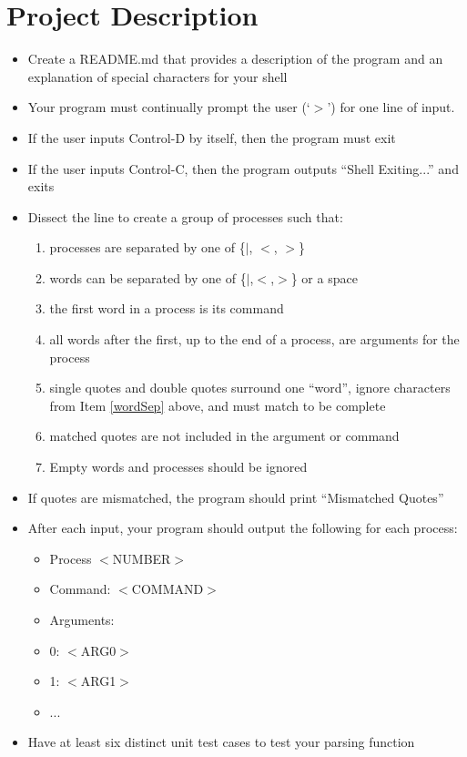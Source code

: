 \documentclass[12pt]{article}
\begin{document}
\section*{Project Description}
\begin{itemize}
\item Create a README.md that provides a description of the program and an explanation of special characters for your shell
\item Your program must continually prompt the user (`$>$') for one line of input.
\item If the user inputs Control-D by itself, then the program must exit
\item If the user inputs Control-C, then the program outputs ``Shell Exiting...'' and exits
\item Dissect the line to create a group of processes such that:
	\begin{enumerate}
	\item processes are separated by one of \{$|$, $<$, $>$\}
	\item \label{wordSep} words can be separated by one of \{$|$,$<$,$>$\} or a space
	\item the first word in a process is its command
	\item all words after the first, up to the end of a process, are arguments for the process
	\item single quotes and double quotes surround one ``word'', ignore characters from Item \ref*{wordSep} above, and must match to be complete
	\item matched quotes are not included in the argument or command
	\item Empty words and processes should be ignored
	\end{enumerate}
\item If quotes are mismatched, the program should print ``Mismatched Quotes''
\item After each input, your program should output the following for each process:
	\begin{itemize}
	\item Process $<$NUMBER$>$
	\item Command: $<$COMMAND$>$
	\item Arguments:
	\item 0: $<$ARG0$>$
	\item 1: $<$ARG1$>$
	\item ...
	\end{itemize}
\item Have at least six distinct unit test cases to test your parsing function
\end{itemize}
\end{document}
